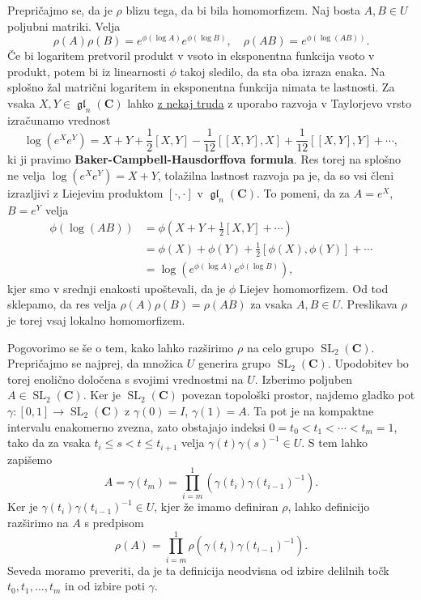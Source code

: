\documentclass[11pt]{book}
\def\CC{\mathbf{C}}
\DeclareMathOperator\glfrak{\mathfrak{gl}}
\DeclareMathOperator\SL{SL}
\def\definicija{\color{rdeca}\bf}
\theoremstyle{definition}
\theoremstyle{zgled}
\theoremstyle{zgledbrezstevilke}
\theoremstyle{odprtproblem}
\theoremstyle{domacanaloga}
\theoremstyle{izrek}
\begin{document}
Prepričajmo se, da je $\rho$ blizu tega, da bi bila homomorfizem. Naj bosta $A,B \in U$ poljubni matriki. Velja
\[
    \rho(A) \rho(B) = e^{\phi(\log A)} e^{\phi(\log B)}, \quad
    \rho(AB) = e^{\phi(\log(AB))}.
\]
Če bi logaritem pretvoril produkt v vsoto in eksponentna funkcija vsoto v produkt, potem bi iz linearnosti $\phi$ takoj sledilo, da sta oba izraza enaka. Na splošno žal matrični logaritem in eksponentna funkcija nimata te lastnosti. Za vsaka $X,Y \in \glfrak_n(\CC)$ lahko \href{https://www.math.ru.nl/~mueger/PDF/BCHD.pdf}{z nekaj truda} z uporabo razvoja v Taylorjevo vrsto izračunamo vrednost
\[
    \log(e^X e^Y) = X + Y + \frac{1}{2} [X,Y] - \frac{1}{12}[[X,Y],X] + \frac{1}{12} [[X,Y], Y] + \cdots,
\]
ki ji pravimo {\definicija Baker-Campbell-Hausdorffova formula}. Res torej na splošno ne velja $\log(e^X e^Y) = X+Y$, tolažilna lastnost razvoja pa je, da so vsi členi izrazljivi z Liejevim produktom $[\cdot,\cdot]$ v $\glfrak_n(\CC)$. To pomeni, da za $A = e^X$, $B = e^Y$ velja
\begin{align*}
    \phi(\log(AB)) 
    &= \phi \left( X + Y + \frac{1}{2}[X,Y] + \cdots \right) \\
    &= \phi(X) + \phi(Y) + \frac{1}{2}[\phi(X), \phi(Y)] + \cdots \\
    &= \log(e^{\phi(\log A)} e^{\phi(\log B)}),
\end{align*}
kjer smo v srednji enakosti upoštevali, da je $\phi$ Liejev homomorfizem. Od tod sklepamo, da res velja $\rho(A)\rho(B) = \rho(AB)$ za vsaka $A,B \in U$. Preslikava $\rho$ je torej vsaj lokalno homomorfizem. 

Pogovorimo se še o tem, kako lahko razširimo $\rho$ na celo grupo $\SL_2(\CC)$. Prepričajmo se najprej, da množica $U$ generira grupo $\SL_2(\CC)$. Upodobitev bo torej enolično določena s svojimi vrednostmi na $U$. Izberimo poljuben $A \in \SL_2(\CC)$. Ker je $\SL_2(\CC)$ povezan topološki prostor, najdemo gladko pot $\gamma \colon [0,1] \to \SL_2(\CC)$ z $\gamma(0) = I$, $\gamma(1) = A$. Ta pot je na kompaktne intervalu enakomerno zvezna, zato obstajajo indeksi $0 = t_0 < t_1 < \cdots < t_m = 1$, tako da za vsaka $t_i \leq s < t \leq t_{i+1}$ velja $\gamma(t) \gamma(s)^{-1} \in U$. S tem lahko zapišemo
\[
    A = \gamma(t_m)
    = \prod_{i = m}^1 \left( \gamma(t_i) \gamma(t_{i-1})^{-1} \right).
\]
Ker je $\gamma(t_i) \gamma(t_{i-1})^{-1} \in U$, kjer že imamo definiran $\rho$, lahko definicijo razširimo na $A$ s predpisom
\[
    \rho(A) = \prod_{i = m}^{1} \rho \left( \gamma(t_i) \gamma(t_{i-1})^{-1} \right).
\]
Seveda moramo preveriti, da je ta definicija neodvisna od izbire delilnih točk $t_0, t_1, \dots, t_m$ in od izbire poti $\gamma$. 
\end{document}
